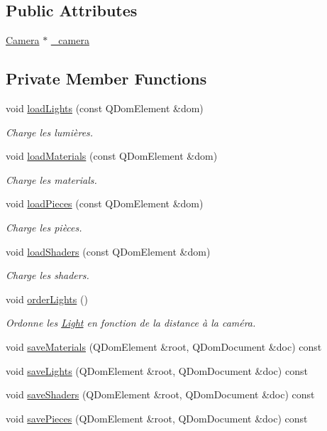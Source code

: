 \subsection*{Public Attributes}
\begin{DoxyCompactItemize}
\item 
\hyperlink{class_camera}{Camera} $\ast$ \hyperlink{class_scene_a8cce9e0f96edc8655a9b9a885e2c26bf}{\+\_\+camera}
\end{DoxyCompactItemize}
\subsection*{Private Member Functions}
\begin{DoxyCompactItemize}
\item 
void \hyperlink{class_scene_a34446952ed460f5a66a90649d6f743ec}{load\+Lights} (const Q\+Dom\+Element \&dom)
\begin{DoxyCompactList}\small\item\em Charge les lumières. \end{DoxyCompactList}\item 
void \hyperlink{class_scene_a8fe39b5221775362f28c78129292e162}{load\+Materials} (const Q\+Dom\+Element \&dom)
\begin{DoxyCompactList}\small\item\em Charge les materials. \end{DoxyCompactList}\item 
void \hyperlink{class_scene_aa6d40bab1b160afc7bb84841d056a07d}{load\+Pieces} (const Q\+Dom\+Element \&dom)
\begin{DoxyCompactList}\small\item\em Charge les pièces. \end{DoxyCompactList}\item 
void \hyperlink{class_scene_a1deb5bb022836f4b585c8580246b26cb}{load\+Shaders} (const Q\+Dom\+Element \&dom)
\begin{DoxyCompactList}\small\item\em Charge les shaders. \end{DoxyCompactList}\item 
void \hyperlink{class_scene_ae6fc45f015d96191dbf775d54d6e4437}{order\+Lights} ()
\begin{DoxyCompactList}\small\item\em Ordonne les \hyperlink{class_light}{Light} en fonction de la distance à la caméra. \end{DoxyCompactList}\item 
void \hyperlink{class_scene_a23faaec79e3e47ab7827411f23dd79d9}{save\+Materials} (Q\+Dom\+Element \&root, Q\+Dom\+Document \&doc) const 
\item 
void \hyperlink{class_scene_a13dc69fb963cd556e3029e7ffc55180b}{save\+Lights} (Q\+Dom\+Element \&root, Q\+Dom\+Document \&doc) const 
\item 
void \hyperlink{class_scene_abaec7f89a0a039c5a770ce06e80d96cd}{save\+Shaders} (Q\+Dom\+Element \&root, Q\+Dom\+Document \&doc) const 
\item 
void \hyperlink{class_scene_ab51c69ad1faae20cf5375c3f02b6e7fc}{save\+Pieces} (Q\+Dom\+Element \&root, Q\+Dom\+Document \&doc) const 
\end{DoxyCompactItemize}
